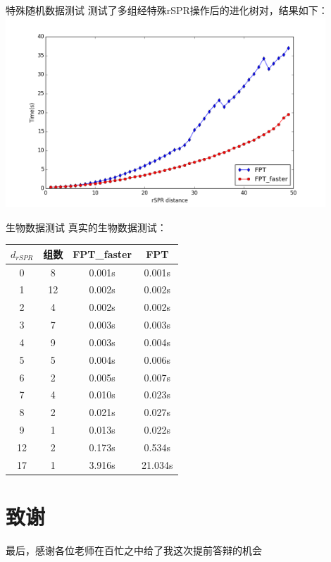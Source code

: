 \documentclass[slidestop,compress,mathserif,red]{beamer}
\begin{document}
\begin{frame}{特殊随机数据测试}
测试了多组经特殊rSPR操作后的进化树对，结果如下：
\includegraphics[width=0.9\textwidth, height=0.7\textheight, keepaspectratio]{./pic/figure_3.png}
\end{frame}

\begin{frame}{生物数据测试}
真实的生物数据测试：
\begin{center}
\begin{tabular}{ c c c c }
  \hline
    $d_{rSPR}$ & 组数 & FPT\_faster & FPT  \\ \hline
    0 & 8 & 0.001s & 0.001s  \\
    1 & 12 & 0.002s & 0.002s \\
    2 & 4 & 0.002s & 0.002s  \\
    3 & 7 & 0.003s & 0.003s  \\
    4 & 9 & 0.003s & 0.004s  \\
    5 & 5 & 0.004s & 0.006s  \\
    6 & 2 & 0.005s & 0.007s \\
    7 & 4 & 0.010s & 0.023s \\
    8 & 2 & 0.021s & 0.027s \\
    9 & 1 & 0.013s & 0.022s \\
    12 & 2 & 0.173s & 0.534s \\
    17 & 1 & 3.916s & 21.034s \\
  \hline
\end{tabular}
\end{center}
\end{frame}

\section{致谢}
\begin{frame}
\vspace{2cm}
  \begin{center}
    \huge{最后，感谢各位老师在百忙之中给了我这次提前答辩的机会}
  \end{center}
\end{frame}
\end{document}
